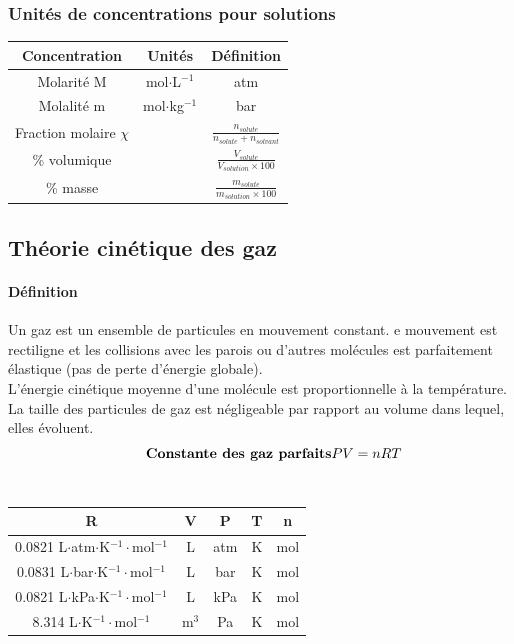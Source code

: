 \documentclass[10pt,a4paper]{book}
\begin{document}
\subsubsection{Unités de concentrations pour solutions}

\begin{center}
\begin{tabular}{| c | c | c |}
\hline
\textbf{Concentration} & \textbf{Unités} & \textbf{Définition} \\
\hline
Molarité M  & mol$\cdot$L$^{-1}$ & atm\\
\hline
Molalité m  & mol$\cdot$kg$^{-1}$ & bar \\
\hline
Fraction molaire $\chi$  &  & $\frac{n_{solute}}{n_{solute}+n_{solvant}} $\\
\hline
\% volumique  &   & $\frac{V_{solute}}{V_{solution}\times100}$\\
\hline
\% masse &  & $\frac{m_{solute}}{m_{solution}\times100}$ \\
\hline
\end{tabular}
\end{center}

\subsection{Théorie cinétique des gaz}

\paragraph{Définition} Un gaz est un ensemble de particules en mouvement constant. e mouvement est rectiligne et les collisions avec les parois ou d'autres molécules est parfaitement élastique (pas de perte d'énergie globale). \\
L'énergie cinétique moyenne d'une molécule est proportionnelle à la température. \\
La taille des particules de gaz est négligeable par rapport au volume dans lequel, elles évoluent. \\
\begin{displaymath}
\tag*{\textbf{Constante des gaz parfaits}}
PV = nRT \label{eq:PVNRT}
\end{displaymath}\\
\begin{center}
\begin{tabular}{| c | c | c | c | c |}
\hline
\textbf{R} & \textbf{V} & \textbf{P} & \textbf{T}  & \textbf{n} \\
\hline
0.0821 L$\cdot$atm$\cdot$K$^{-1}\cdot$mol$^{-1}$  & L & atm & K  & mol \\
\hline
0.0831 L$\cdot$bar$\cdot$K$^{-1}\cdot$mol$^{-1}$  & L & bar & K  & mol \\
\hline
0.0821 L$\cdot$kPa$\cdot$K$^{-1}\cdot$mol$^{-1}$  & L & kPa & K  & mol \\
\hline
8.314 L$\cdot$K$^{-1}\cdot$mol$^{-1}$  & m$^3$ & Pa & K  & mol \\
\hline
\end{tabular}
\end{center}
\end{document}
